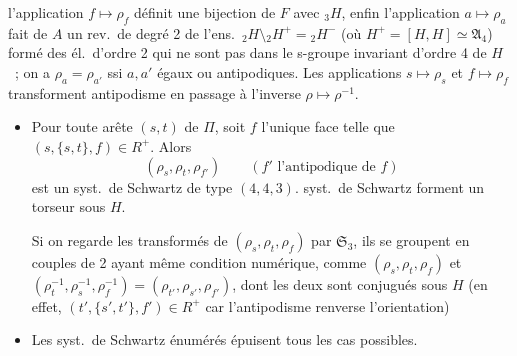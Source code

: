 \documentclass[11pt,a4paper]{article}
\begin{document}
l'application $f \mapsto \rho_f$ définit une bijection de $F$ avec ${}_3H$,
enfin l'application $a \mapsto \rho_a$ fait de $A$ un rev.\ de degré 2 de
l'ens.\ ${}_2H \setminus {}_2H^{+} = {}_2H^{-}$ (où
$H^{+} = [H, H] \simeq \mathfrak{A}_4$) formé des él.\ d'ordre 2 qui ne sont
pas dans le s-groupe invariant d'ordre 4 de $H$~; on a
$\rho_a = \rho_{a'}$ ssi $a, a'$ égaux ou antipodiques. Les applications
$s \mapsto \rho_s$ et $f \mapsto \rho_f$ transforment antipodisme en passage
à l'inverse $\rho \mapsto \rho^{-1}$.
\begin{itemize}
\item[c)] Pour toute arête $(s, t)$ de $\Pi$, soit $f$ l'unique face telle que
$(s, \{s, t\}, f) \in R^{+}$.  Alors
\[
(\rho_s, \rho_t, \rho_{f'}) \qquad (f' \text{ l'antipodique de } f)
\]
est un syst.\ de Schwartz de type $(4, 4, 3)$. 
 syst.\ de Schwartz forment un torseur sous $H$.

Si on regarde les  transformés de $(\rho_s, \rho_t, \rho_f)$ par
$\mathfrak{S}_3$, ils se groupent en couples de 2 ayant même condition
numérique, comme $(\rho_s, \rho_t, \rho_f)$ et
$(\rho_t^{-1}, \rho_s^{-1}, \rho_f^{-1}) = (\rho_{t'}, \rho_{s'}, \rho_{f'})$,
dont les deux sont conjugués sous $H$ (en effet,
$(t', \{s', t'\}, f') \in R^{+}$ car l'antipodisme renverse l'orientation)
\item[d)] Les syst.\ de Schwartz énumérés épuisent tous les cas possibles.
\end{itemize}
\end{document}
